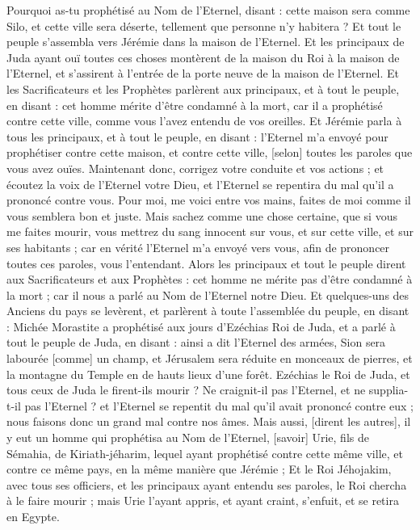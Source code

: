 \begin{multicols}{2}
Pourquoi as-tu prophétisé au Nom de l'Eternel, disant : cette maison sera comme Silo, et cette ville sera déserte, tellement que personne n'y habitera ? Et tout le peuple s'assembla vers Jérémie dans la maison de l'Eternel.
Et les principaux de Juda ayant ouï toutes ces choses montèrent de la maison du Roi à la maison de l'Eternel, et s'assirent à l'entrée de la porte neuve de la maison de l'Eternel.
Et les Sacrificateurs et les Prophètes parlèrent aux principaux, et à tout le peuple, en disant : cet homme mérite d'être condamné à la mort, car il a prophétisé contre cette ville, comme vous l'avez entendu de vos oreilles.
Et Jérémie parla à tous les principaux, et à tout le peuple, en disant : l'Eternel m'a envoyé pour prophétiser contre cette maison, et contre cette ville, [selon] toutes les paroles que vous avez ouïes.
Maintenant donc, corrigez votre conduite et vos actions ; et écoutez la voix de l'Eternel votre Dieu, et l'Eternel se repentira du mal qu'il a prononcé contre vous.
Pour moi, me voici entre vos mains, faites de moi comme il vous semblera bon et juste.
Mais sachez comme une chose certaine, que si vous me faites mourir, vous mettrez du sang innocent sur vous, et sur cette ville, et sur ses habitants ; car en vérité l'Eternel m'a envoyé vers vous, afin de prononcer toutes ces paroles, vous l'entendant.
Alors les principaux et tout le peuple dirent aux Sacrificateurs et aux Prophètes : cet homme ne mérite pas d'être condamné à la mort ; car il nous a parlé au Nom de l'Eternel notre Dieu.
Et quelques-uns des Anciens du pays se levèrent, et parlèrent à toute l'assemblée du peuple, en disant :
Michée Morastite a prophétisé aux jours d'Ezéchias Roi de Juda, et a parlé à tout le peuple de Juda, en disant : ainsi a dit l'Eternel des armées, Sion sera labourée [comme] un champ, et Jérusalem sera réduite en monceaux de pierres, et la montagne du Temple en de hauts lieux d'une forêt.
Ezéchias le Roi de Juda, et tous ceux de Juda le firent-ils mourir ? Ne craignit-il pas l'Eternel, et ne supplia-t-il pas l'Eternel ? et l'Eternel se repentit du mal qu'il avait prononcé contre eux ; nous faisons donc un grand mal contre nos âmes.
Mais aussi, [dirent les autres], il y eut un homme qui prophétisa au Nom de l'Eternel, [savoir] Urie, fils de Sémahia, de Kiriath-jéharim, lequel ayant prophétisé contre cette même ville, et contre ce même pays, en la même manière que Jérémie ;
Et le Roi Jéhojakim, avec tous ses officiers, et les principaux ayant entendu ses paroles, le Roi chercha à le faire mourir ; mais Urie l'ayant appris, et ayant craint, s'enfuit, et se retira en Egypte.

\end{multicols}
